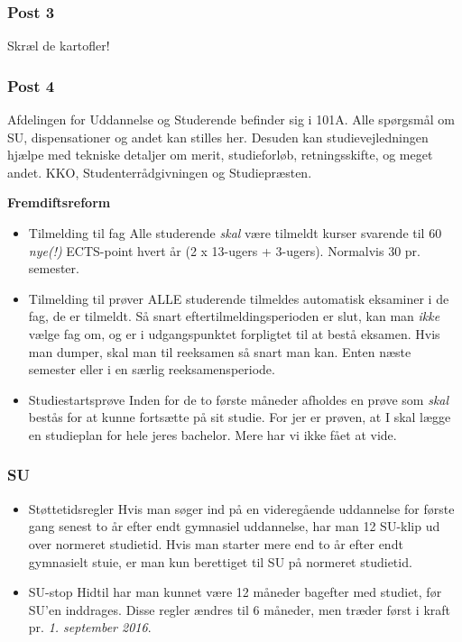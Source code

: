 \subsubsection{Post 3}
Skræl de kartofler!

\subsubsection{Post 4}
Afdelingen for Uddannelse og Studerende befinder sig i 101A. Alle spørgsmål om SU, dispensationer og andet kan stilles her. Desuden kan studievejledningen hjælpe med tekniske detaljer om merit, studieforløb, retningsskifte, og meget andet.
KKO, Studenterrådgivningen og Studiepræsten.

\textbf{Fremdiftsreform}\\
\begin{itemize}
  \item{Tilmelding til fag} Alle studerende \emph{skal} være tilmeldt kurser svarende til 60 \emph{nye(!)} ECTS-point hvert år (2 x 13-ugers + 3-ugers). Normalvis 30 pr. semester.
  \item{Tilmelding til prøver} ALLE studerende tilmeldes automatisk eksaminer i de fag, de er tilmeldt. Så snart eftertilmeldingsperioden er slut, kan man \emph{ikke} vælge fag om, og er i udgangspunktet forpligtet til at bestå eksamen. Hvis man dumper, skal man til reeksamen så snart man kan. Enten næste semester eller i en særlig reeksamensperiode.
  \item{Studiestartsprøve} Inden for de to første måneder afholdes en prøve som \emph{skal} bestås for at kunne fortsætte på sit studie. For jer er prøven, at I skal lægge en studieplan for hele jeres bachelor. Mere har vi ikke fået at vide.
\end{itemize}

\subsubsection*{SU}
\label{sub:SU}
\begin{itemize}
  \item{Støttetidsregler} Hvis man søger ind på en videregående uddannelse for første gang senest to år efter endt gymnasiel uddannelse, har man 12 SU-klip ud over normeret studietid. Hvis man starter mere end to år efter endt gymnasielt stuie, er man kun berettiget til SU på normeret studietid.
  \item{SU-stop} Hidtil har man kunnet være 12 måneder bagefter med studiet, før SU'en inddrages. Disse regler ændres til 6 måneder, men træder først i kraft pr. \emph{1. september 2016}.
\end{itemize}

